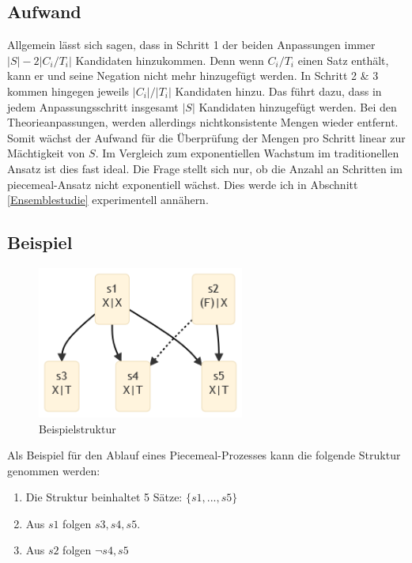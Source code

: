 \documentclass{article}
\begin{document}
\subsection{Aufwand}
Allgemein lässt sich sagen, dass in Schritt 1 der beiden Anpassungen immer $\lvert S \rvert - 2\lvert C_i/T_i \rvert$ Kandidaten hinzukommen. Denn wenn $C_i/T_i$ einen Satz enthält, kann er und seine Negation nicht mehr hinzugefügt werden. In Schritt 2 \& 3 kommen hingegen jeweils $\lvert C_i \rvert / \lvert T_i \rvert$ Kandidaten hinzu. Das führt dazu, dass in jedem Anpassungsschritt insgesamt $\lvert S \rvert$ Kandidaten hinzugefügt werden. Bei den Theorieanpassungen, werden allerdings nichtkonsistente Mengen wieder entfernt. Somit wächst der Aufwand für die Überprüfung der Mengen pro Schritt linear zur Mächtigkeit von $S$. Im Vergleich zum exponentiellen Wachstum im traditionellen Ansatz ist dies fast ideal. Die Frage stellt sich nur, ob die Anzahl an Schritten im piecemeal-Ansatz nicht exponentiell wächst. Dies werde ich in Abschnitt \ref{Ensemblestudie} experimentell annähern.

\subsection{Beispiel}
\begin{figure}[ht]
  \centering
  \includegraphics[width=\textwidth,height=5cm,keepaspectratio]{images/reduced_classical.png}
  \caption{Beispielstruktur\label{fig:classset-initial1}}
\end{figure}

 Als Beispiel für den Ablauf eines Piecemeal-Prozesses kann die folgende Struktur genommen werden:
 \begin{enumerate}
     \item Die Struktur beinhaltet 5 Sätze: $\{s1,...,s5\}$
     \item Aus $s1$ folgen $s3, s4, s5$.
     \item Aus $s2$ folgen $\neg s4, s5$
 \end{enumerate}
 
\end{document}
